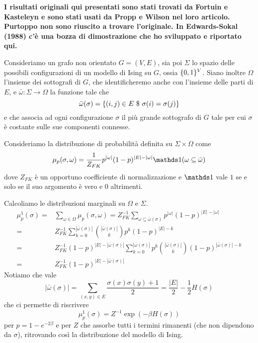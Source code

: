 \documentclass[]{marticle}
\begin{document}
\textbf{I risultati originali qui presentati sono stati trovati da Fortuin e
Kasteleyn e sono stati usati da Propp e Wilson nel loro articolo. Purtoppo non
sono riuscito a trovare l'originale. In Edwards-Sokal (1988) c'\`e una bozza di
dimostrazione che ho sviluppato e riportato qui.}

Consideriamo un grafo non orientato $G=(V,E)$, sia poi $\Sigma$ lo spazio delle
possibili configurazioni di un modello di Ising su $G$, ossia $\{0,1\}^V$.
Siano inoltre $\Omega$ l'insieme dei sottografi di $G$, che identificheremo
anche con l'insieme delle parti di $E$, e $\bar{\omega}\colon \Sigma
\longrightarrow \Omega$ la funzione tale che 
\[
    \bar{\omega}(\sigma) = \{(i,j)\in E \ \$\  \sigma(i) = \sigma(j)\}
\]
e che associa ad ogni configurazione $\sigma$ il pi\`u grande sottografo di $G$
tale per cui $\sigma$ \`e costante sulle sue componenti connesse.

Consideriamo la distribuzione di probabilit\`a definita su $\Sigma \times
\Omega$ come
\[
    \mu_p(\sigma, \omega) = \frac{1}{Z_{FK}} p^{|\omega|} (1-p)^{|E| - |\omega|}
    \ind(\omega \subseteq \bar{\omega})
\]
dove $Z_{FK}$ \`e un opportuno coefficiente di normalizzazione e $\ind$ vale $1$ se
e solo se il suo argomento \`e vero e $0$ altrimenti.

Calcoliamo le distribuzioni marginali su $\Omega$ e $\Sigma$.
\begin{align*}
    \mu^1_p(\sigma) =& \sum_{\omega\in\Omega} \mu_p(\sigma,\omega) = 
    Z_{FK}^{-1} \sum_{\omega\subseteq\bar{\omega}(\sigma)}  p^{|\omega|}
    (1-p)^{|E| - |\omega|} \\
    =& Z_{FK}^{-1} \sum_{k=0}^{|\bar{\omega}(\sigma)|}
        \binom{|\bar{\omega}(\sigma)|}{k}
        p^k (1-p)^{|E| - k} \\
    =& Z_{FK}^{-1} (1-p)^{|E|-|\bar{\omega}(\sigma)|}
        \sum_{k=0}^{|\bar{\omega}(\sigma)|}  p^k
        \binom{|\bar{\omega}(\sigma)|}{k}
        (1-p)^{|\bar{\omega}(\sigma)| - k} \\
    =& Z_{FK}^{-1} (1-p)^{|E|-|\bar{\omega}(\sigma)|}
\end{align*}
Notiamo che vale
\[
    |\bar{\omega}(\sigma)| = \sum_{(x,y)\in E} \frac{\sigma(x) \sigma(y) +
    1}{2} = \frac{|E|}{2} - \frac{1}{2}H(\sigma)
\]
che ci permette di riscrivere
\[
    \mu^1_p(\sigma) = Z^{-1} \exp(-\beta H(\sigma))
\]
per $p = 1-e^{-2\beta}$ e per $Z$ che assorbe tutti i termini rimanenti (che non
dipendono da $\sigma$), ritrovando cos\`i la distribuzione del modello di Ising.
\end{document}
